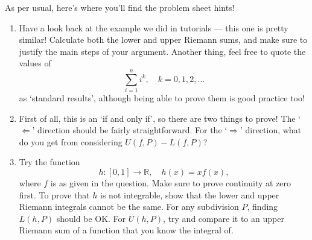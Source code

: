 \documentclass[
  17pt,
  a4paper]{extarticle}
\providecommand{\tightlist}{%
  \setlength{\itemsep}{0pt}\setlength{\parskip}{0pt}}
\theoremstyle{plain}
\theoremstyle{definition}
\theoremstyle{plain}
\theoremstyle{plain}
\theoremstyle{plain}
\theoremstyle{plain}
\theoremstyle{definition}
\theoremstyle{definition}
\theoremstyle{remark}
\theoremstyle{remark}
\renewcommand{\;}{\,}
\begin{document}
As per usual, here's where you'll find the problem sheet hints!

\begin{enumerate}
\def\labelenumi{\arabic{enumi})}
\tightlist
\item
  Have a look back at the example we did in tutorials --- this one is pretty similar! Calculate both the lower and upper Riemann sums, and make sure to justify the main steps of your argument. Another thing, feel free to quote the values of \[\sum_{i=1}^{n} i^{k}, \quad k=0,1,2,\ldots\] as `standard results', although being able to prove them is good practice too!
\item
  First of all, this is an `if and only if', so there are two things to prove! The `\(\Leftarrow\)' direction should be fairly straightforward. For the `\(\Rightarrow\)' direction, what do you get from considering \(U(f,P) - L(f,P)\)?
\item
  Try the function \[h:[0,1] \to \mathbb{R}, \quad h(x) = xf(x),\] where \(f\) is as given in the question. Make sure to prove continuity at zero first. To prove that \(h\) is not integrable, show that the lower and upper Riemann integrals cannot be the same. For any subdivision \(P\), finding \(L(h,P)\) should be OK. For \(U(h,P)\), try and compare it to an upper Riemann sum of a function that you know the integral of.
\end{enumerate}
\end{document}
